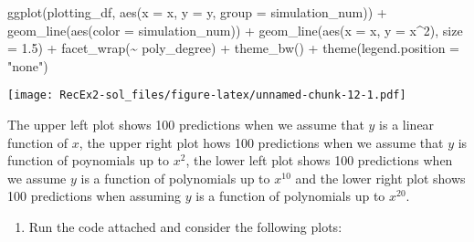 \documentclass[
]{article}
\newenvironment{Shaded}{\begin{snugshade}}{\end{snugshade}}
\newcommand{\AttributeTok}[1]{\textcolor[rgb]{0.77,0.63,0.00}{#1}}
\newcommand{\DecValTok}[1]{\textcolor[rgb]{0.00,0.00,0.81}{#1}}
\newcommand{\FloatTok}[1]{\textcolor[rgb]{0.00,0.00,0.81}{#1}}
\newcommand{\FunctionTok}[1]{\textcolor[rgb]{0.00,0.00,0.00}{#1}}
\newcommand{\NormalTok}[1]{#1}
\newcommand{\SpecialCharTok}[1]{\textcolor[rgb]{0.00,0.00,0.00}{#1}}
\newcommand{\StringTok}[1]{\textcolor[rgb]{0.31,0.60,0.02}{#1}}
\providecommand{\tightlist}{%
  \setlength{\itemsep}{0pt}\setlength{\parskip}{0pt}}
\begin{document}
\begin{Shaded}
\begin{Highlighting}[]
\FunctionTok{ggplot}\NormalTok{(plotting\_df, }\FunctionTok{aes}\NormalTok{(}\AttributeTok{x =}\NormalTok{ x, }\AttributeTok{y =}\NormalTok{ y, }\AttributeTok{group =}\NormalTok{ simulation\_num)) }\SpecialCharTok{+}
  \FunctionTok{geom\_line}\NormalTok{(}\FunctionTok{aes}\NormalTok{(}\AttributeTok{color =}\NormalTok{ simulation\_num)) }\SpecialCharTok{+}
  \FunctionTok{geom\_line}\NormalTok{(}\FunctionTok{aes}\NormalTok{(}\AttributeTok{x =}\NormalTok{ x, }\AttributeTok{y =}\NormalTok{ x}\SpecialCharTok{\^{}}\DecValTok{2}\NormalTok{), }\AttributeTok{size =} \FloatTok{1.5}\NormalTok{) }\SpecialCharTok{+}
  \FunctionTok{facet\_wrap}\NormalTok{(}\SpecialCharTok{\textasciitilde{}}\NormalTok{ poly\_degree) }\SpecialCharTok{+}
  \FunctionTok{theme\_bw}\NormalTok{() }\SpecialCharTok{+}
  \FunctionTok{theme}\NormalTok{(}\AttributeTok{legend.position =} \StringTok{"none"}\NormalTok{)}
\end{Highlighting}
\end{Shaded}

\texttt{[image: RecEx2-sol\_files/figure-latex/unnamed-chunk-12-1.pdf]}

The upper left plot shows 100 predictions when we assume that \(y\) is a
linear function of \(x\), the upper right plot hows 100 predictions when
we assume that \(y\) is function of poynomials up to \(x^2\), the lower
left plot shows 100 predictions when we assume \(y\) is a function of
polynomials up to \(x^{10}\) and the lower right plot shows 100
predictions when assuming \(y\) is a function of polynomials up to
\(x^{20}\).

\begin{enumerate}
\def\labelenumi{\alph{enumi})}
\setcounter{enumi}{1}
\tightlist
\item
  Run the code attached and consider the following plots:
\end{enumerate}
\end{document}
